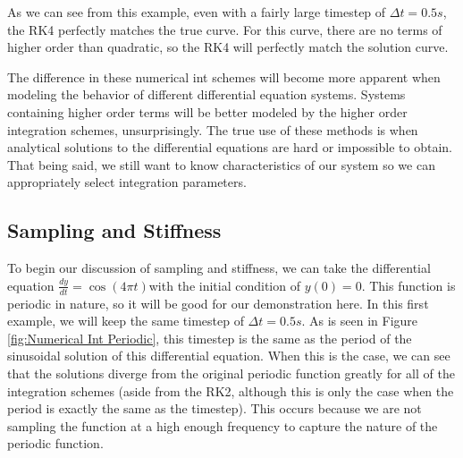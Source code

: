 \documentclass[12pt]{report}
\begin{document}
As we can see from this example, even with a fairly large timestep of $\Delta t=0.5s$, the RK4 perfectly matches the true curve. For this curve, there are no terms of higher order than quadratic, so the RK4 will perfectly match the solution curve.

The difference in these \gls{numerical int} schemes will become more apparent when modeling the behavior of different differential equation systems. Systems containing higher order terms will be better modeled by the higher order integration schemes, unsurprisingly. The true use of these methods is when analytical solutions to the differential equations are hard or impossible to obtain. That being said, we still want to know characteristics of our system so we can appropriately select integration parameters.

\subsection{Sampling and Stiffness}\label{sampling and stiffness}
 To begin our discussion of sampling and stiffness, we can take the differential equation $\frac{dy}{dt}=\cos(4\pi t)$with the initial condition of $y(0)=0$. This function is periodic in nature, so it will be good for our demonstration here. In this first example, we will keep the same timestep of $\Delta t=0.5s$. As is seen in Figure \ref{fig:Numerical Int Periodic}, this timestep is the same as the period of the sinusoidal solution of this differential equation. When this is the case, we can see that the solutions diverge from the original periodic function greatly for all of the integration schemes (aside from the RK2, although this is only the case when the period is exactly the same as the timestep). This occurs because we are not sampling the function at a high enough frequency to capture the nature of the periodic function.
\end{document}
